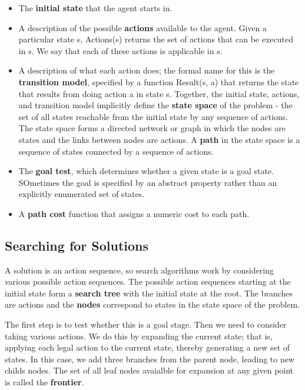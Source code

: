 \documentclass{article}
\begin{document}
\begin{itemize}
    \item The \textbf{initial state} that the agent starts in.
    \item A description of the possible \textbf{actions} available to the agent. Given a particular state s, Actions(s) returns the set of actions that can be executed in s. We say that each of these actions is applicable in s.
    \item A description of what each action does; the formal name for this is the \textbf{transition model}, specified by a function Result(s, a) that returns the state that results from doing action a in state s. Together, the initial state, actions, and transition model implicitly define the \textbf{state space} of the problem - the set of all states reachable from the initial state by any sequence of actions. The state space forms a directed network or graph in which the nodes are states and the links between nodes are actions. A \textbf{path} in the state space is a sequence of states connected by a sequence of actions.
    \item The \textbf{goal test}, which determines whether a given state is a goal state. SOmetimes the goal is specified by an abstract property rather than an explicitly enumerated set of states.
    \item A \textbf{path cost} function that assigns a numeric cost to each path.
\end{itemize}

\subsection{Searching for Solutions}

A solution is an action sequence, so search algorithms work by considering various possible action sequences. The possible action sequences starting at the initial state form a \textbf{search tree} with the initial state at the root. The branches are actions and the \textbf{nodes} correspond to states in the state space of the problem.

The first step is to test whether this is a goal stage. Then we need to consider taking various actions. We do this by expanding the current state; that is, applying each legal action to the current state, thereby generating a new set of states. In this case, we add three branches from the parent node, leading to new childs nodes. The set of all leaf nodes avaialble for expansion at any given point is called the \textbf{frontier}.
\end{document}
